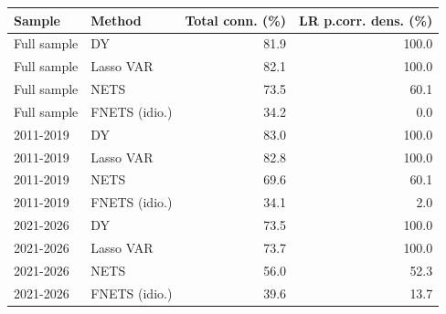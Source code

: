 \begin{tabular}{llrr}
\toprule
Sample & Method & Total conn. (\%) & LR p.corr. dens. (\%) \\
\midrule
Full sample & DY & 81.9 & 100.0 \\
Full sample & Lasso VAR & 82.1 & 100.0 \\
Full sample & NETS & 73.5 & 60.1 \\
Full sample & FNETS (idio.) & 34.2 & 0.0 \\
2011-2019 & DY & 83.0 & 100.0 \\
2011-2019 & Lasso VAR & 82.8 & 100.0 \\
2011-2019 & NETS & 69.6 & 60.1 \\
2011-2019 & FNETS (idio.) & 34.1 & 2.0 \\
2021-2026 & DY & 73.5 & 100.0 \\
2021-2026 & Lasso VAR & 73.7 & 100.0 \\
2021-2026 & NETS & 56.0 & 52.3 \\
2021-2026 & FNETS (idio.) & 39.6 & 13.7 \\
\bottomrule
\end{tabular}
